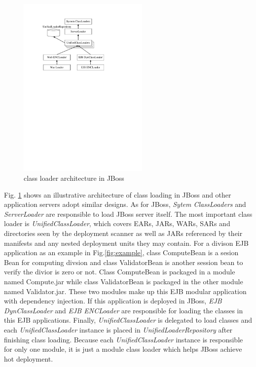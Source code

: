 \documentclass[conference]{IEEEtran}
\begin{document}
\begin{figure}[ht]
\centering
\includegraphics[width=2.5in]{JBossClassLoader.pdf}
\caption{class loader architecture in JBoss}
\label{fig:jboss_class_loader}
\end{figure}

Fig. \ref{fig:jboss_class_loader} shows an illustrative architecture of class loading in JBoss and other application servers adopt similar designs.
As for JBoss, \emph{Sytem ClassLoaders} and \emph{ServerLoader} are responsible to load JBoss server itself. 
The most important class loader is \emph{UnifiedClassLoader}, which covers EARs, JARs, WARs, SARs and directories seen by the deployment scanner as well as JARs referenced by their manifests and any nested deployment units they may contain\cite{jboss_class_loader}. 
For a divison EJB\cite{EJB} application as an example in Fig.\ref{fig:example}, class ComputeBean is a sesion Bean for computing divsion and class ValidatorBean is another session bean to verify the divior is zero or not.
Class ComputeBean is packaged in a module named Compute.jar while class ValidatorBean is packaged in the other module named Validator.jar.
These two modules make up this EJB modular application with dependency injection\cite{DI}.
If this application is deployed in JBoss, \emph{EJB DynClassLoader} and \emph{EJB ENCLoader} are responsible for loading the classes in this EJB applications. Finally, \emph{UnifiedClassLoader} is delegated to load classes and each \emph{UnifiedClassLoader} instance is placed in \emph{UnifiedLoaderRepository} after finishing class loading. Because each \emph{UnifiedClassLoader} instance is responsible for only one module, it is just a module class loader which helps JBoss achieve hot deployment.
\end{document}
